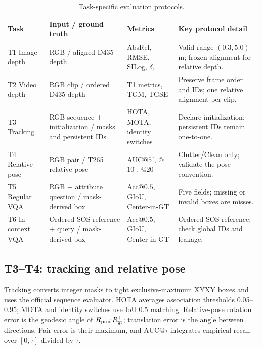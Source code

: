 \begin{table}[t]
\centering
\caption{Task-specific evaluation protocols.}
\label{tab:appendix-task-protocols}
\footnotesize
\setlength{\tabcolsep}{3.6pt}
\renewcommand{\arraystretch}{1.04}
\begin{tabular}{@{}>{\raggedright\arraybackslash}p{2.15cm}>{\raggedright\arraybackslash}p{3.75cm}>{\raggedright\arraybackslash}p{3.7cm}>{\raggedright\arraybackslash}p{6.9cm}@{}}
\toprule
Task & Input / ground truth & Metrics & Key protocol detail \\
\midrule
T1 Image depth & RGB / aligned D435 depth & AbsRel, RMSE, SILog, $\delta_1$ & Valid range $(0.3,5.0)$\,m; frozen alignment for relative depth. \\
T2 Video depth & RGB clip / ordered D435 depth & T1 metrics, TGM, TGSE & Preserve frame order and IDs; one relative alignment per clip. \\
T3 Tracking & RGB sequence + initialization / masks and persistent IDs & HOTA, MOTA, identity switches & Declare initialization; persistent IDs remain one-to-one. \\
T4 Relative pose & RGB pair / T265 relative pose & AUC@$5^\circ$, @$10^\circ$, @$20^\circ$ & Clutter/Clean only; validate the pose convention. \\
T5 Regular VQA & RGB + attribute question / mask-derived box & Acc@$0.5$, GIoU, Center-in-GT & Five fields; missing or invalid boxes are misses. \\
T6 In-context VQA & Ordered SOS reference + query / mask-derived box & Acc@$0.5$, GIoU, Center-in-GT & Ordered SOS reference; check global IDs and leakage. \\
\bottomrule
\end{tabular}
\end{table}

\subsection{T3--T4: tracking and relative pose}

Tracking converts integer masks to tight exclusive-maximum XYXY boxes and uses the official sequence evaluator. HOTA averages association thresholds 0.05--0.95; MOTA and identity switches use IoU 0.5 matching. Relative-pose rotation error is the geodesic angle of $R_{\rm pred}R_{\rm gt}^{\top}$; translation error is the angle between directions. Pair error is their maximum, and AUC@$\tau$ integrates empirical recall over $[0,\tau]$ divided by $\tau$.

